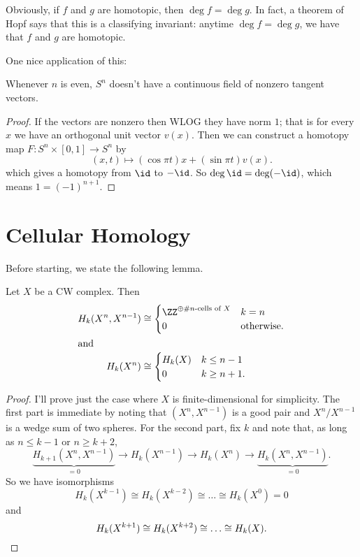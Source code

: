 \documentclass[11pt]{scrreprt}
\begin{document}
Obviously, if $f$ and $g$ are homotopic, then $\deg f = \deg g$.
In fact, a theorem of Hopf says that this is a classifying invariant:
anytime $\deg f = \deg g$, we have that $f$ and $g$ are homotopic.

One nice application of this:
\begin{theorem}
	Whenever $n$ is even, $S^n$ doesn't have a continuous field
	of nonzero tangent vectors.
\end{theorem}
\begin{proof}
	If the vectors are nonzero then WLOG they have norm $1$;
	that is for every $x$ we have an orthogonal unit vector $v(x)$.
	Then we can construct a homotopy map $F : S^n \times [0,1] \to S^n$ by
	\[ (x,t) \mapsto (\cos \pi t)x + (\sin \pi t) v(x). \]
	which gives a homotopy from $\id$ to $-\id$.
	So $\deg \id = \deg(-\id)$, which means $1 = (-1)^{n+1}$.
\end{proof}

\section{Cellular Homology}
Before starting, we state the following lemma.
\begin{lemma}
	Let $X$ be a CW complex. Then
	\begin{align*}
		H_k(X^n, X^{n-1}) &\cong
		\begin{cases}
			\ZZ^{\oplus\text{\#$n$-cells of $X$}} & k = n \\
			0 & \text{otherwise}.
		\end{cases} \\
		\intertext{and}
		H_k(X^n) &\cong
		\begin{cases}
			H_k(X) & k \le n-1 \\
			0 & k \ge n+1.
		\end{cases}
	\end{align*}
\end{lemma}
\begin{proof}
	I'll prove just the case where $X$ is finite-dimensional for simplicity.
	The first part is immediate by noting that $(X^n, X^{n-1})$ is a good pair
	and $X^n/X^{n-1}$ is a wedge sum of two spheres.
	For the second part, fix $k$ and note that, as long as $n \le k-1$ or $n \ge k+2$,
	\[
		\underbrace{H_{k+1}(X^n, X^{n-1})}_{=0}
		\to H_k(X^{n-1})
		\to H_k(X^n)
		\to \underbrace{H_{k}(X^n, X^{n-1})}_{=0}.
	\]
	So we have isomorphisms
	\[ H_k(X^{k-1}) \cong H_k(X^{k-2}) \cong \dots \cong H_k(X^0) = 0 \]
	and
	\[ H_k(X^{k+1}) \cong H_k(X^{k+2}) \cong \dots \cong H_k(X). \qedhere \]
\end{proof}
\end{document}
